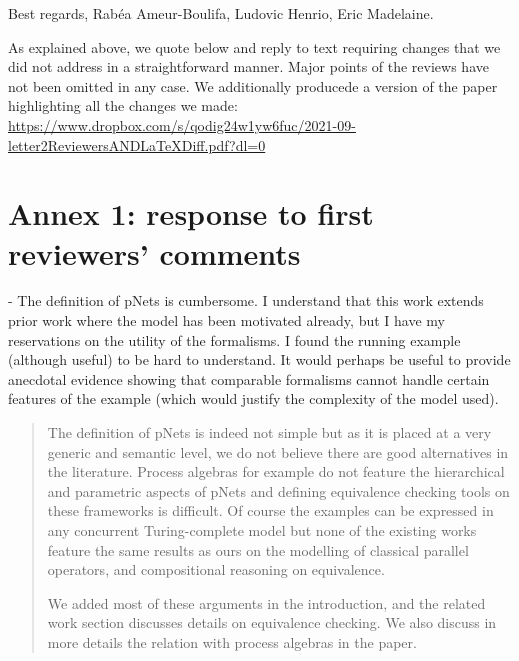 \documentclass{article}
\begin{document}
\bigskip
\noindent
Best regards,
\newline
\noindent
Rab\'ea Ameur-Boulifa, Ludovic Henrio, Eric Madelaine.

\newpage
As explained above, we quote below and reply to text requiring changes that we did not 
address in a straightforward manner. Major points of the reviews have not been omitted in 
any case. We additionally producede a version of the paper highlighting all the changes we made: \url{https://www.dropbox.com/s/qodig24w1yw6fuc/2021-09-letter2ReviewersANDLaTeXDiff.pdf?dl=0}

\section*{Annex 1: response to first reviewers' comments}

- The definition of pNets is cumbersome. I understand that this work extends prior work where the model has been motivated already, but I have my reservations on the utility of the formalisms.    I found the running example (although useful) to be hard to understand.  It would perhaps be useful to provide anecdotal evidence showing that comparable formalisms cannot handle certain features of the example (which would justify the complexity of the model used).
\begin{quote}
The definition of pNets is indeed not simple but as it is placed at a very generic and semantic level, we do not believe there are good alternatives in the literature. Process algebras for example do not feature the hierarchical and parametric aspects of pNets and defining equivalence checking tools on these frameworks is difficult. Of course the examples can be expressed in any concurrent Turing-complete model but none of the existing works feature the same results as ours on the modelling of classical parallel operators, and compositional reasoning on equivalence.

We added most of these arguments in the introduction, and the related work section discusses details on equivalence checking. We also discuss in more details the relation with process algebras in the paper.
\end{quote}
\end{document}
